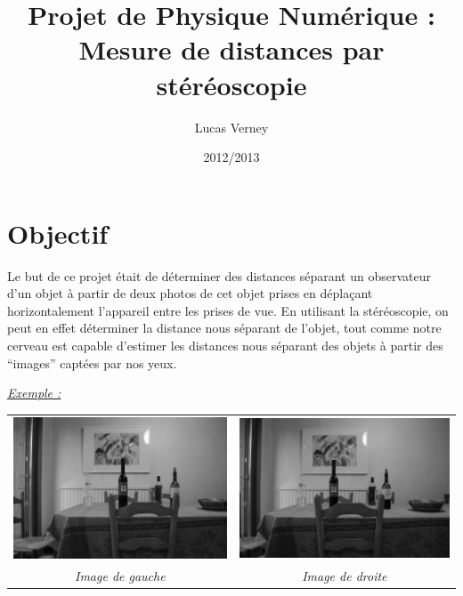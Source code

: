 \documentclass[10pt,a4paper]{article}
\title{Projet de Physique Numérique : Mesure de distances par stéréoscopie}
\author{Lucas Verney}
\date{2012/2013}
\begin{document}
	\maketitle
	
	\section{Objectif}
		Le but de ce projet était de déterminer des distances séparant un observateur d'un objet à partir de deux photos de cet objet prises en déplaçant horizontalement l'appareil entre les prises de vue. En utilisant la stéréoscopie, on peut en effet déterminer la distance nous séparant de l'objet, tout comme notre cerveau est capable d'estimer les distances nous séparant des objets à partir des ``images'' captées par nos yeux.
		
		\bigskip
		
		\underline{\emph{Exemple :}}
		\medskip
		
		\begin{center}
			\begin{tabular}{cc}
				\includegraphics[scale=0.25]{IMG_0114s.JPG} & \includegraphics[scale=0.25]{IMG_0115s.JPG} \\
				\emph{Image de gauche} & \emph{Image de droite} \\
			\end{tabular}
		\end{center}
		
\end{document}
